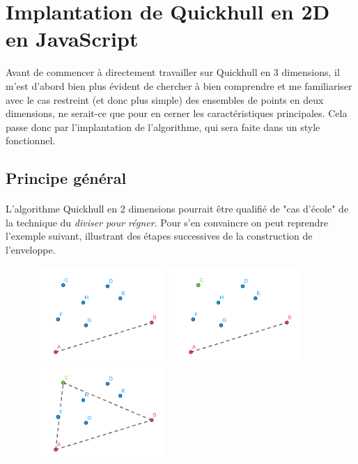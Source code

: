 \documentclass[]{article}
\begin{document}
\section{Implantation de Quickhull en 2D en JavaScript}
Avant de commencer à directement travailler sur Quickhull en 3 dimensions, il m'est d'abord bien plus évident de chercher à bien comprendre et me familiariser avec le cas restreint (et donc plus simple) des ensembles de points en deux dimensions, ne serait-ce que pour en cerner les caractéristiques principales. Cela passe donc par l'implantation de l'algorithme, qui sera faite dans un style fonctionnel.

\subsection{Principe général}
\paragraph{}
L'algorithme Quickhull en 2 dimensions pourrait être qualifié de "cas d'école" de la technique du \emph{diviser pour régner}. Pour s'en convaincre on peut reprendre l'exemple suivant, illustrant des étapes successives de la construction de l'enveloppe.

\begin{figure}[H]
	\begin{center}
		\includegraphics[width=5cm]{qh2d/geogebra-export.png}
		\includegraphics[width=5cm]{qh2d/geogebra-export2.png}
		\includegraphics[width=5cm]{qh2d/geogebra-export3.png}
	\end{center}
\end{figure}
\end{document}
